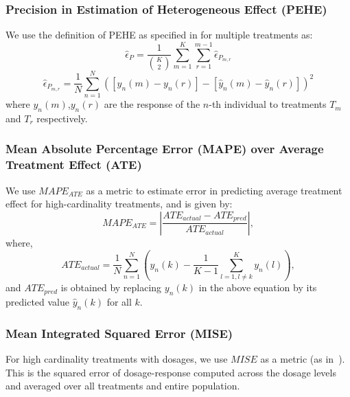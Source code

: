\documentclass[twoside,11pt]{article}
\begin{document}
\subsubsection{Precision in Estimation of Heterogeneous Effect (PEHE)} 
We use the definition of PEHE as specified in \citep{schwab2018perfect} for multiple treatments as:
\begin{equation}
    {\hat\epsilon_{P}} = \frac{1}{\binom{K}{2}}\sum_{m=1}^{K}\sum_{r=1}^{m-1}{\hat\epsilon_{P_{m,r}}}
\end{equation}
\begin{equation}
    \hat\epsilon_{P_{m,r}} = \frac{1}{N}\sum_{n=1}^{N}([y_{n}(m) - y_{n}(r)] - [\hat y_{n}(m) - \hat y_{n}(r)])^2
\end{equation}
where $y_{n}(m)$,$y_{n}(r)$ are the response of the $n$-{th} individual to treatments $T_m$ and $T_r$ respectively.
\subsubsection{Mean Absolute Percentage Error (MAPE) over Average Treatment Effect (ATE)}
We use $MAPE_{ATE}$ as a metric to estimate error in predicting average treatment effect for high-cardinality treatments, and is given by:
\begin{equation}
    MAPE_{ATE} = \left|\frac{ATE_{actual} - ATE_{pred}}{ATE_{actual}}\right|,
\end{equation}
where,
\begin{equation}
    ATE_{actual} = \frac{1}{N}\sum_{n=1}^{N} \left(y_{n}(k) - \frac{1}{K-1}\sum_{l=1, l \neq k}^{K}y_{n}(l)\right),
\end{equation}
and $ATE_{pred}$ is obtained by replacing $y_{n}(k)$ in the above equation by its predicted value $\hat y_{n}(k)$ for all $k$.

\subsubsection{Mean Integrated Squared Error (MISE)} For high cardinality treatments with dosages, we use $MISE$ as a metric (as in~\citep{schwab2019learning}). This is the squared error of dosage-response computed across the dosage levels and averaged over all treatments and entire population.
\end{document}
